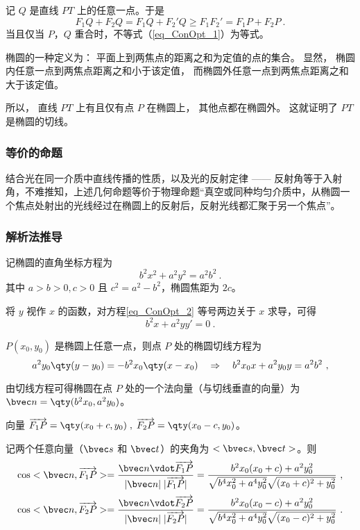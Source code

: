 记 $Q$ 是直线 $PT$ 上的任意一点。于是
\begin{equation}\label{eq_ConOpt_1}
F_1Q + F_2Q = F_1Q + F_2'Q \geqslant F_1F_2' = F_1P + F_2P~.
\end{equation}
当且仅当 $P$，$Q$ 重合时，不等式（\autoref{eq_ConOpt_1}）为等式。

椭圆的一种定义为：
平面上到两焦点的距离之和为定值的点的集合。 显然， 椭圆内任意一点到两焦点距离之和小于该定值， 而椭圆外任意一点到两焦点距离之和大于该定值。 

所以， 直线 $PT$ 上有且仅有点 $P$ 在椭圆上， 其他点都在椭圆外。 这就证明了 $PT$ 是椭圆的切线。

\subsubsection{等价的命题}
结合光在同一介质中直线传播的性质，以及光的反射定律 —— 反射角等于入射角，不难推知，上述几何命题等价于物理命题“真空或同种均匀介质中，从椭圆一个焦点处射出的光线经过在椭圆上的反射后，反射光线都汇聚于另一个焦点”。

\subsubsection{解析法推导}
记椭圆的直角坐标方程为
\begin{equation}\label{eq_ConOpt_2}
b^2 x^2 +a^2 y^2=a^2 b^2~.
\end{equation}
其中 $a>b>0,c>0$ 且 $c^2=a^2-b^2$，椭圆焦距为 $2c$。

将 $y$ 视作 $x$ 的函数，对方程\autoref{eq_ConOpt_2} 等号两边关于 $x$ 求导，可得
\begin{equation}
b^2 x +a^2 yy'= 0~.
\end{equation}

$P(x_0,y_0)$ 是椭圆上任意一点，则点 $P$ 处的椭圆切线方程为
\begin{equation}
a^2 y_0 \qty(y - y_0) = - b^2 x_0 \qty(x - x_0) \quad
\Rightarrow \quad
b^2 x_0 x + a^2 y_0 y = a^2 b^2~,
\end{equation}

由切线方程可得椭圆在点 $P$ 处的一个法向量（与切线垂直的向量）为 $\bvec n = \qty(b^2 x_0,a^2 y_0)$。

向量 $\overrightarrow{F_1P}=\qty(x_0 +c,y_0)\; ,\; \overrightarrow{F_2P}=\qty(x_0 -c,y_0)$。

记两个任意向量（$\bvec s$ 和 $\bvec t$）的夹角为 $<\bvec s,\bvec t>$。则
\begin{equation}\label{eq_ConOpt_5}
\cos<\bvec n,\overrightarrow{F_1P}>=\frac{\bvec n \vdot \overrightarrow{F_1P}}{|\bvec n| \; |\overrightarrow{F_1P}|}= \frac{b^2 x_0 (x_0+c)+a^2 y_0^2}{\sqrt{b^4 x_0^2+a^4 y_0^2}\sqrt{(x_0+c)^2+y_0^2}}~,
\end{equation}
\begin{equation}\label{eq_ConOpt_6}
\cos<\bvec n,\overrightarrow{F_2P}>=\frac{\bvec n \vdot \overrightarrow{F_2P}}{|\bvec n| \; |\overrightarrow{F_2P}|}= \frac{b^2 x_0 (x_0-c)+a^2 y_0^2}{\sqrt{b^4 x_0^2+a^4 y_0^2}\sqrt{(x_0-c)^2+y_0^2}}~.
\end{equation}


